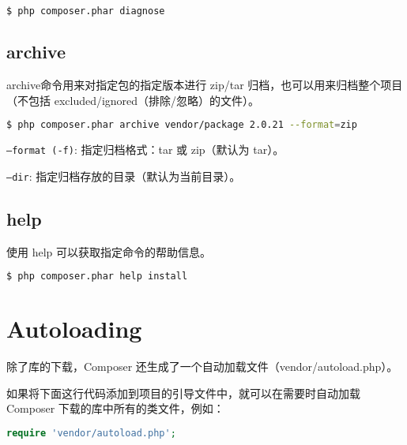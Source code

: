\begin{lstlisting}[language=bash]
$ php composer.phar diagnose
\end{lstlisting}

\section{archive}

archive命令用来对指定包的指定版本进行 zip/tar 归档，也可以用来归档整个项目（不包括 excluded/ignored（排除/忽略）的文件）。

\begin{lstlisting}[language=bash]
$ php composer.phar archive vendor/package 2.0.21 --format=zip
\end{lstlisting}

\begin{compactitem}
\item \texttt{--format (-f)}: 指定归档格式：tar 或 zip（默认为 tar）。
\item \texttt{--dir}: 指定归档存放的目录（默认为当前目录）。
\end{compactitem}



\section{help}

使用 help 可以获取指定命令的帮助信息。

\begin{lstlisting}[language=bash]
$ php composer.phar help install
\end{lstlisting}




















\chapter{Autoloading}

除了库的下载，Composer 还生成了一个自动加载文件（vendor/autoload.php）。

如果将下面这行代码添加到项目的引导文件中，就可以在需要时自动加载 Composer 下载的库中所有的类文件，例如：

\begin{lstlisting}[language=PHP]
require 'vendor/autoload.php';
\end{lstlisting}


